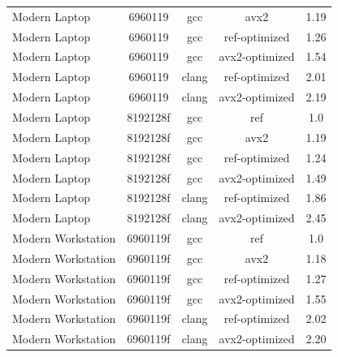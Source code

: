 \begin{table}
\begin{tabularx}{\linewidth}{X c c c c}
               Modern Laptop &              6960119 &                  gcc &                 avx2 &                1.19\\
               Modern Laptop &              6960119 &                  gcc &        ref-optimized &                1.26\\
               Modern Laptop &              6960119 &                  gcc &       avx2-optimized &                1.54\\
               Modern Laptop &              6960119 &                clang &        ref-optimized &                2.01\\
               Modern Laptop &              6960119 &                clang &       avx2-optimized &                2.19\\
               Modern Laptop &             8192128f &                  gcc &                  ref &                  1.0\\
               Modern Laptop &             8192128f &                  gcc &                 avx2 &                1.19\\
               Modern Laptop &             8192128f &                  gcc &        ref-optimized &                1.24\\
               Modern Laptop &             8192128f &                  gcc &       avx2-optimized &                1.49\\
               Modern Laptop &             8192128f &                clang &        ref-optimized &                1.86\\
               Modern Laptop &             8192128f &                clang &       avx2-optimized &                2.45\\
          Modern Workstation &             6960119f &                  gcc &                  ref &                 1.0\\
          Modern Workstation &             6960119f &                  gcc &                 avx2 &                1.18\\
          Modern Workstation &             6960119f &                  gcc &        ref-optimized &                1.27\\
          Modern Workstation &             6960119f &                  gcc &       avx2-optimized &                1.55\\
          Modern Workstation &             6960119f &                clang &        ref-optimized &                2.02\\
          Modern Workstation &             6960119f &                clang &       avx2-optimized &                2.20\\

\end{tabularx}
\end{table}
